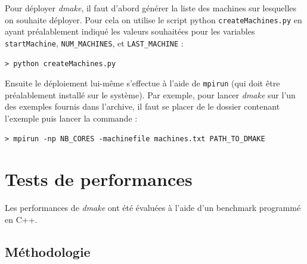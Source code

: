 \documentclass[a4paper,12pt,twoside]{article}
\begin{document}
Pour déployer \emph{dmake}, il faut d'abord générer la liste des
machines sur lesquelles on souhaite déployer. Pour cela on utilise le
script python \texttt{createMachines.py} en ayant préalablement indiqué
les valeurs souhaitées pour les variables \texttt{startMachine},
\texttt{NUM\_MACHINES}, et \texttt{LAST\_MACHINE} : 
\begin{verbatim}
> python createMachines.py
\end{verbatim}

Ensuite le déploiement lui-même s'effectue à l'aide de
\texttt{mpirun} (qui doit être préalablement installé sur le système). Par exemple, pour lancer \emph{dmake} sur l'un des
exemples fournis dans l'archive, il faut se placer de le dossier
contenant l'exemple puis lancer la commande :
\begin{verbatim}
> mpirun -np NB_CORES -machinefile machines.txt PATH_TO_DMAKE
\end{verbatim}



\section{Tests de performances}

Les performances de \emph{dmake} ont été évaluées à l'aide d'un
benchmark programmé en C++.

\subsection{Méthodologie}
\end{document}
